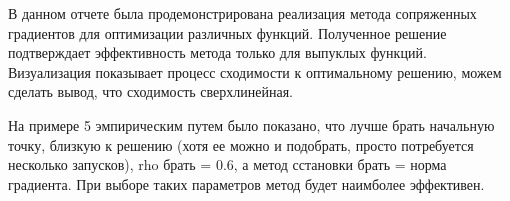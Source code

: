 \documentclass{article}
\begin{document}
В данном отчете была продемонстрирована реализация метода сопряженных градиентов для оптимизации различных функций. Полученное решение подтверждает эффективность метода только для выпуклых функций. Визуализация показывает процесс сходимости к оптимальному решению, можем сделать вывод, что сходимость сверхлинейная.

На примере 5 эмпирическим путем было показано, что лучше брать начальную точку, близкую к решению (хотя ее можно и подобрать, просто потребуется несколько запусков), rho брать = 0.6, а метод сстановки брать = норма градиента. При выборе таких параметров метод будет наимболее эффективен.

 
\end{document}
